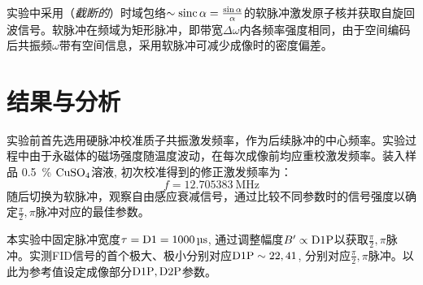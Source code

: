 \documentclass[aps,pre,12pt,preprint,%
	onecolumn,showpacs,showkeys,nofootinbib]{revtex4-1}
\newcommand{\cuSample}{$\mrm{CuSO_4}$溶液}
\newcommand{\perc}[1]{\SI{#1}{\percent}}
\begin{document}
	实验中采用（\textit{截断的}）时域包络$\sim \operatorname{sinc}\alpha = \frac{\sin\alpha}{\alpha}$的软脉冲激发原子核并获取自旋回波信号。软脉冲在频域为矩形脉冲，即带宽$\Delta\omega$内各频率强度相同，由于空间编码后共振频$\omega$带有空间信息，采用软脉冲可减少成像时的密度偏差。
\clearpage
\section{结果与分析}
%
%
\vspace{-1ex}
	实验前首先选用硬脉冲校准质子共振激发频率，作为后续脉冲的中心频率。实验过程中由于永磁体的磁场强度随温度波动，在每次成像前均应重校激发频率。装入样品 \perc{.5} \cuSample, 初次校准得到的修正激发频率为：
	\begin{equation}
		f = \SI{12.705383}{\MHz}
	\end{equation}
	随后切换为软脉冲，观察自由感应衰减信号，通过比较不同参数时的信号强度以确定$\frac{\pi}{2},\pi$脉冲对应的最佳参数。
	
	本实验中固定脉冲宽度$\tau = \tup{D1} = \SI{1000}{\us}$, 通过调整幅度$B' \propto \textup{D1P}$以获取$\frac{\pi}{2},\pi$脉冲。实测FID信号的首个极大、极小分别对应$\textup{D1P} \sim 22, 41$, 分别对应$\frac{\pi}{2},\pi$脉冲。以此为参考值设定成像部分$\textup{D1P}, \textup{D2P}$参数。
	
\end{document}
